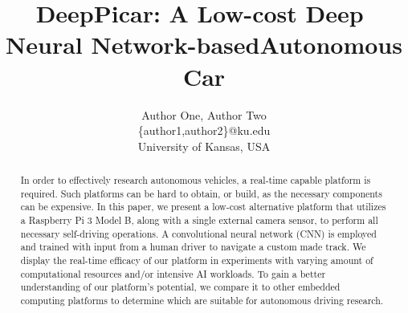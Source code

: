 \documentclass[10pt, conference]{IEEEtran}
\begin{document}
\title{DeepPicar:​ ​A​ ​Low-cost​ ​Deep​ ​Neural​ ​Network-based​ ​Autonomous​ ​Car}
\author{Author One, Author Two\\
\{author1,author2\}@ku.edu\\
University of Kansas, USA\\ 
}

\maketitle
\thispagestyle{empty}
\begin{abstract}
In order to effectively research autonomous vehicles, a real-time capable platform is required. Such 
platforms can be hard to obtain, or build, as the necessary components can be expensive. In this paper, 
we present a low-cost alternative platform that utilizes a Raspberry Pi 3 Model B, along with a single 
external camera sensor, to perform all necessary self-driving operations. A convolutional neural network 
(CNN) is employed and trained with input from a human driver to navigate a custom made track. We display 
the real-time efficacy of our platform in experiments with varying amount of computational resources 
and/or intensive AI workloads. To gain a better understanding of our platform's potential, we compare it 
to other embedded computing platforms to determine which are suitable for autonomous driving research.
\end{abstract}










\appendix
\end{document}
